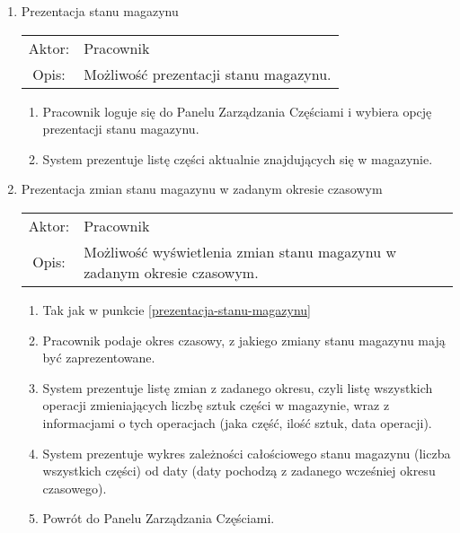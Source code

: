 \begin{enumerate}
  \item Prezentacja stanu magazynu \label{prezentacja-stanu-magazynu} \\
  \begin{tabularx}{\linewidth}{ c X }
  Aktor: & Pracownik \\
  Opis: & Możliwość prezentacji stanu magazynu.\\
  \end{tabularx}
   \begin{enumerate}
    \item Pracownik loguje się do Panelu Zarządzania Częściami i wybiera opcję prezentacji stanu magazynu.
    \item System prezentuje listę części aktualnie znajdujących się w magazynie.
  \end{enumerate}
  
  \item Prezentacja zmian stanu magazynu w zadanym okresie czasowym \\
  \begin{tabularx}{\linewidth}{ c X }
  Aktor: & Pracownik \\
  Opis: & Możliwość wyświetlenia zmian stanu magazynu w zadanym okresie czasowym.\\
  \end{tabularx}
   \begin{enumerate}
    \item Tak jak w punkcie \ref{prezentacja-stanu-magazynu}
    \item Pracownik podaje okres czasowy, z jakiego zmiany stanu magazynu mają być zaprezentowane.
    \item System prezentuje listę zmian z zadanego okresu, czyli listę wszystkich operacji zmieniających liczbę sztuk części w magazynie, wraz z informacjami o tych operacjach (jaka część, ilość sztuk, data operacji).
    \item System prezentuje wykres zależności całościowego stanu magazynu (liczba wszystkich części) od daty (daty pochodzą z zadanego wcześniej okresu czasowego).
    \item Powrót do Panelu Zarządzania Częściami.
  \end{enumerate}
  

\end{enumerate}
